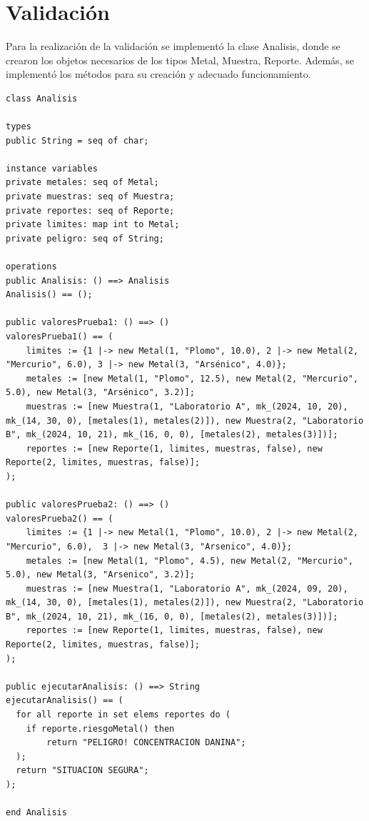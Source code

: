 \section{Validación}
Para la realización de la validación se implementó la clase Analisis, donde se crearon los objetos necesarios de los tipos Metal, Muestra, Reporte. Además, se implementó los métodos para su creación y adecuado funcionamiento.

\begin{lstlisting}
class Analisis

types
public String = seq of char;

instance variables
private metales: seq of Metal;
private muestras: seq of Muestra;
private reportes: seq of Reporte;
private limites: map int to Metal;
private peligro: seq of String;

operations
public Analisis: () ==> Analisis
Analisis() == ();

public valoresPrueba1: () ==> () 
valoresPrueba1() == (
	limites := {1 |-> new Metal(1, "Plomo", 10.0), 2 |-> new Metal(2, "Mercurio", 6.0), 3 |-> new Metal(3, "Arsénico", 4.0)};
	metales := [new Metal(1, "Plomo", 12.5), new Metal(2, "Mercurio", 5.0), new Metal(3, "Arsénico", 3.2)];
	muestras := [new Muestra(1, "Laboratorio A", mk_(2024, 10, 20), mk_(14, 30, 0), [metales(1), metales(2)]), new Muestra(2, "Laboratorio B", mk_(2024, 10, 21), mk_(16, 0, 0), [metales(2), metales(3)])];
	reportes := [new Reporte(1, limites, muestras, false), new Reporte(2, limites, muestras, false)];
);

public valoresPrueba2: () ==> () 
valoresPrueba2() == (
	limites := {1 |-> new Metal(1, "Plomo", 10.0), 2 |-> new Metal(2, "Mercurio", 6.0),  3 |-> new Metal(3, "Arsenico", 4.0)};
	metales := [new Metal(1, "Plomo", 4.5), new Metal(2, "Mercurio", 5.0), new Metal(3, "Arsenico", 3.2)];
	muestras := [new Muestra(1, "Laboratorio A", mk_(2024, 09, 20), mk_(14, 30, 0), [metales(1), metales(2)]), new Muestra(2, "Laboratorio B", mk_(2024, 10, 21), mk_(16, 0, 0), [metales(2), metales(3)])];
	reportes := [new Reporte(1, limites, muestras, false), new Reporte(2, limites, muestras, false)];
);

public ejecutarAnalisis: () ==> String
ejecutarAnalisis() == (
  for all reporte in set elems reportes do (
    if reporte.riesgoMetal() then
		return "PELIGRO! CONCENTRACION DANINA";
  );
  return "SITUACION SEGURA";
);

end Analisis
\end{lstlisting}


